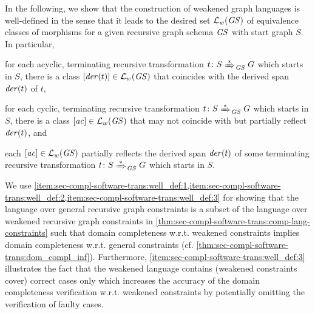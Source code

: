 In the following, we show that the construction of weakened graph languages is well-defined in the sense that it leads to the desired set $\mathcal{L}_w(\mathit{GS})$ of equivalence classes of morphisms for a given recursive graph schema $\mathit{GS}$ with start graph $S$.
In particular, 
\begin{enumerate*}
\item \label{item:sec-compl-software-trans:well_def:1}for each acyclic, terminating recursive transformation $t\colon S \Trans{*}_\GS G$ which starts in $S$, there is a class $[\mathit{der}(t)] \in \mathcal{L}_w(\mathit{GS})$ that coincides with the derived span $\mathit{der}(t)$ of $t$,
\item \label{item:sec-compl-software-trans:well_def:2}for each cyclic, terminating recursive transformation $t\colon S \Trans{*}_\GS G$ which starts in $S$, there is a class $[\mathit{ac}] \in \mathcal{L}_w(\mathit{GS})$ that may not coincide with but partially reflect $\mathit{der}(t)$, and
\item \label{item:sec-compl-software-trans:well_def:3}each $[\mathit{ac}] \in \mathcal{L}_w(\mathit{GS})$ partially reflects the derived span $\mathit{der}(t)$ of some terminating recursive transformation $t\colon S \Trans{*}_\GS G$ which starts in $S$.
\end{enumerate*}
We use \cref{item:sec-compl-software-trans:well_def:1,item:sec-compl-software-trans:well_def:2,item:sec-compl-software-trans:well_def:3} for showing that the language over general recursive graph constraints is a subset of the language over weakened recursive graph constraints in \cref{thm:sec-compl-software-trans:comp-lang-constraints} such that domain completeness w.r.t. weakened constraints implies domain completeness w.r.t. general constraints (cf. \cref{thm:sec-compl-software-trans:dom_compl_inf}).
Furthermore, \cref{item:sec-compl-software-trans:well_def:3} illustrates the fact that the weakened language contains (weakened constraints cover) correct cases only which increases the accuracy of the domain completeness verification w.r.t. weakened constraints by potentially omitting the verification of faulty cases.

